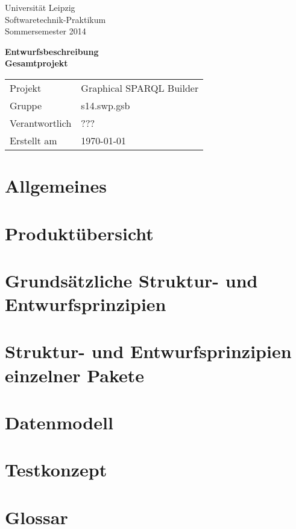 \def\verantwortlicher{???} %
\thispagestyle{empty} 

\vspace*{2\baselineskip}

\begin{center}
\sffamily
Universität Leipzig\\
Softwaretechnik-Praktikum\\
Sommersemester 2014
\baselineskip

\bgroup
\Huge\textbf{Entwurfsbeschreibung\\ Gesamtprojekt}
\egroup
{}\baselineskip

\begin{tabular}{ll}
Projekt & Graphical SPARQL Builder \\
Gruppe & s14.swp.gsb \\
Verantwortlich & \verantwortlicher\\
Erstellt am & \today \\
\end{tabular}
\end{center}

\vfill%

\tableofcontents

\pagebreak



\section{Allgemeines}

\section{Produktübersicht}

\section{Grundsätzliche Struktur- und Entwurfsprinzipien}

\section{Struktur- und Entwurfsprinzipien einzelner Pakete}

\section{Datenmodell}

\section{Testkonzept}

\section{Glossar}

